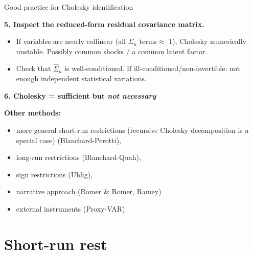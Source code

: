 \documentclass{beamer}
\begin{document}
\begin{frame}{Good practice for Cholesky identification}
\small

\textbf{5. Inspect the reduced-form residual covariance matrix.}
\begin{itemize}
  \item If variables are nearly collinear (all $\Sigma_u$ terms$\approx$ $1$), Cholesky numerically unstable. Possibly common shocks / a common latent factor.
  \item Check that $\hat\Sigma_u$ is well-conditioned. If ill-conditioned/non-invertible: not enough independent statistical variations. 
\end{itemize}

\medskip

\textbf{6. Cholesky = sufficient but \emph{not necessary}}

\medskip

\normalsize
\textbf{Other methods:}
\begin{itemize}
  \item more general short-run restrictions (recursive Cholesky decomposition is a special case) (Blanchard-Perotti),
  \item long-run restrictions (Blanchard-Quah),
  \item sign restrictions (Uhlig),
  \item narrative approach (Romer \& Romer, Ramey) 
  \item external instruments (Proxy-VAR).
\end{itemize}

\end{frame}















\section{Short-run rest}
\end{document}
